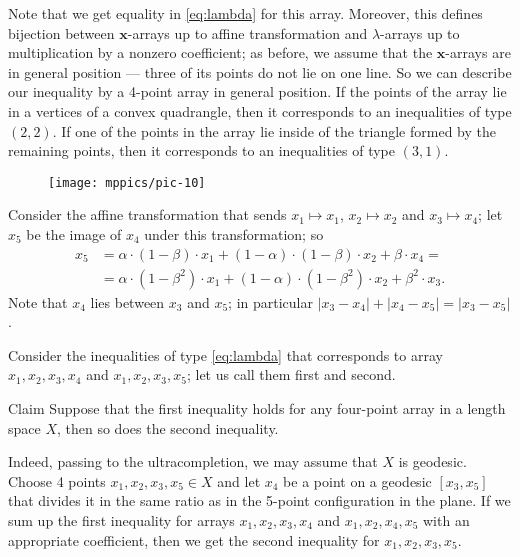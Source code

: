 \documentclass[a4paper,10pt]{article}
\begin{document}
Note that we get equality in \ref{eq:lambda} for this array.
Moreover, this defines bijection between $\bm{x}$-arrays up to affine transformation and $\lambda$-arrays up to multiplication by a nonzero coefficient;
as before, we assume that the $\bm{x}$-arrays are in general position --- three of its points do not lie on one line.
So we can describe our inequality by a 4-point array in general position.
If the points of the array lie in a vertices of a convex quadrangle,
then it corresponds to an inequalities of type $(2,2)$.
If one of the points in the array lie inside of the triangle formed by the remaining points, then it corresponds to an inequalities of type $(3,1)$.

\begin{figure}[ht!]
\vskip-0mm
\centering
\texttt{[image: mppics/pic-10]}
\vskip0mm
\end{figure}

Consider the affine transformation that sends $x_1\mapsto x_1$, $x_2\mapsto x_2$ and $x_3\mapsto x_4$;
let $x_5$ be the image of $x_4$ under this transformation; so \begin{align*}
x_5&=\alpha\cdot (1-\beta)\cdot x_1+(1-\alpha)\cdot(1-\beta)\cdot x_2+\beta\cdot x_4=
\\
&=\alpha\cdot (1-\beta^2)\cdot x_1+(1-\alpha)\cdot(1-\beta^2)\cdot x_2+\beta^2\cdot x_3.
\end{align*}
Note that $x_4$ lies between $x_3$ and $x_5$;
in particular $|x_3-x_4|+|x_4-x_5|=|x_3-x_5|$.

Consider the inequalities of type \ref{eq:lambda} that corresponds to array $x_1,x_2,x_3,x_4$ and $x_1,x_2,x_3,x_5$;
let us call them first and second.

\begin{thm}{Claim}
Suppose that the first inequality holds for any four-point array in a length space $X$, then so does the second inequality.
\end{thm}

Indeed, passing to the ultracompletion, we may assume that $X$ is geodesic.
Choose 4 points $x_1,x_2,x_3,x_5\in X$ and let $x_4$ be a point on a geodesic $[x_3,x_5]$ that divides it in the same ratio as in the 5-point configuration in the plane.
If we sum up the first inequality for arrays $x_1,x_2,x_3,x_4$ and $x_1,x_2,x_4,x_5$ with an appropriate coefficient, then we get the second inequality for $x_1,x_2,x_3,x_5$.
\end{document}
